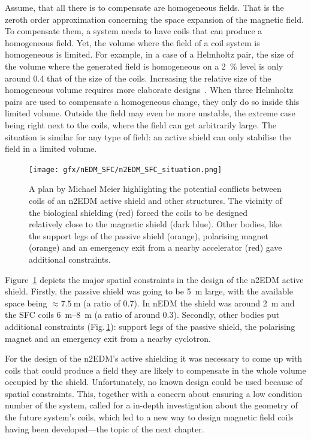  Assume, that all there is to compensate are homogeneous fields. That is the zeroth order approximation concerning the space expansion of the magnetic field. To compensate them, a system needs to have coils that can produce a homogeneous field. Yet, the volume where the field of a coil system is homogeneous is limited. For example, in a case of a Helmholtz pair, the size of the volume where the generated field is homogeneous on a \SI{2}{\percent} level is only around \num{0.4} that of the size of the coils. Increasing the relative size of the homogeneous volume requires more elaborate designs~\cite{Kirschvink1992}. When three Helmholtz pairs are used to compensate a homogeneous change, they only do so inside this limited volume. Outside the field may even be more unstable, the extreme case being right next to the coils, where the field can get arbitrarily large. The situation is similar for any type of field: an active shield can only stabilise the field in a limited volume.

\begin{figure}
  \centering
  \texttt{[image: gfx/nEDM\_SFC/n2EDM\_SFC\_situation.png]}
  \caption{A plan by Michael Meier highlighting the potential conflicts between coils of an n2EDM active shield and other structures. The vicinity of the biological shielding (red) forced the coils to be designed relatively close to the magnetic shield (dark blue). Other bodies, like the support legs of the passive shield (orange), polarising magnet (orange) and an emergency exit from a nearby accelerator (red) gave additional constraints.}\label{fig:n2EDM_sfc_situational_plan}
\end{figure}

Figure~\ref{fig:n2EDM_sfc_situational_plan} depicts the major spatial constraints in the design of the n2EDM active shield. Firstly, the passive shield was going to be \SI{5}{\metre} large, with the available space being $\approx \SI{7.5}{\metre}$ (a ratio of \num{0.7}). In nEDM the shield was around \SI{2}{\meter} and the SFC coils \SIrange[range-phrase = --, range-units=single]{6}{8}{\meter} (a ratio of around 0.3). Secondly, other bodies put additional constraints (Fig.\,\ref{fig:n2EDM_sfc_situational_plan}): support legs of the passive shield, the polarising magnet and an emergency exit from a nearby cyclotron.

For the design of the n2EDM's active shielding it was necessary to come up with coils that could produce a field they are likely to compensate in the whole volume occupied by the shield. Unfortunately, no known design could be used because of spatial constraints. This, together with a concern about ensuring a low condition number of the system, called for a in-depth investigation about the geometry of the future system's coils, which led to a new way to design magnetic field coils having been developed---the topic of the next chapter.

